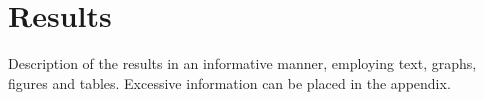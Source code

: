 \chapter{Results}\label{ch:3}

Description of the results in an informative manner, employing text, graphs, figures and tables. Excessive information can be placed in the appendix.